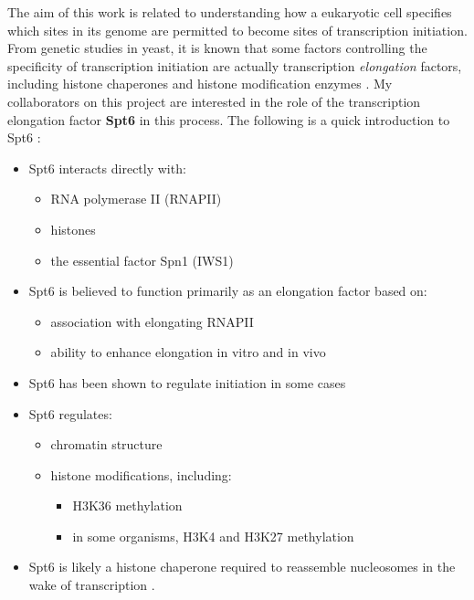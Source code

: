 \documentclass[9pt, letterpaper]{article}
\begin{document}
The aim of this work is related to understanding how a eukaryotic cell specifies which sites in its genome are permitted to become sites of transcription initiation. From genetic studies in yeast, it is known that some factors controlling the specificity of transcription initiation are actually transcription \textit{elongation} factors, including histone chaperones and histone modification enzymes \cite{kaplan2003, cheung2008, hennig2013}. My collaborators on this project are interested in the role of the transcription elongation factor \textbf{Spt6} in this process. The following is a quick introduction to Spt6 \cite{doris2018}:

\begin{itemize}[nosep, topsep=.5em]
\item Spt6 interacts directly with:
	\begin{itemize}[nosep]
	\item RNA polymerase II (RNAPII) \cite{close2011, diebold2011, liu2011, sdano2017, sun2010, yoh2007}
	\item histones \cite{bortvin1996, mccullough2015}
	\item the essential factor Spn1 (IWS1) \cite{diebold2010b, li2018, mcdonald2010}
	\end{itemize}
\item Spt6 is believed to function primarily as an elongation factor based on:
	\begin{itemize}[nosep]
	\item association with elongating RNAPII \cite{andrulis2000, ivanovska2011, kaplan2000, mayer2010}
	\item ability to enhance elongation in vitro \cite{endoh2004} and in vivo \cite{ardehali2009}
	\end{itemize}
\item Spt6 has been shown to regulate initiation in some cases \cite{adkins2006, ivanovska2011}
\item Spt6 regulates:
	\begin{itemize}[nosep]
	\item chromatin structure \cite{bortvin1996, degennaro2013, ivanovska2011, jeronimo2015, kaplan2003, perales2013, vanbakel2013}
	\item histone modifications, including:
		\begin{itemize}[nosep]
		\item H3K36 methylation \cite{carrozza2005, chu2006, yoh2008, youdell2008}
		\item in some organisms, H3K4 and H3K27 methylation \cite{begum2012, chen2012, degennaro2013, wang2017, wang2013}
		\end{itemize}
	\end{itemize}
\item Spt6 is likely a histone chaperone required to reassemble nucleosomes in the wake of transcription \cite{duina2011}.
\end{itemize}
\end{document}
